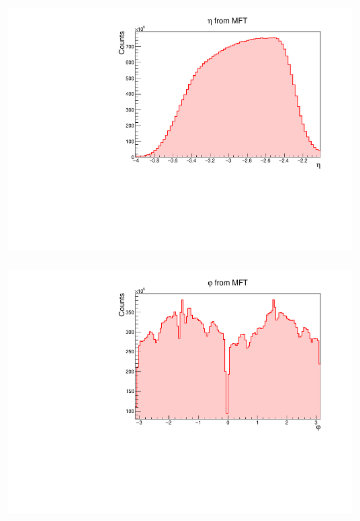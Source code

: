 \begin{figure}[h]%
    \centering
    \begin{subfigure}[t]{.49\linewidth}
        \centering
        \includegraphics[width=\linewidth]{Plots/pass4_MFT/MFTeta_pass4.pdf}
        \caption{}
        \label{}
    \end{subfigure}
    \hfill
    \begin{subfigure}[t]{.49\linewidth}
        \centering
        \includegraphics[width=\linewidth]{Plots/pass4_MFT/phi_pass4.pdf}
        \caption{}
        \label{}
    \end{subfigure}
    \begin{subfigure}[t]{.49\linewidth}
        \centering

\end{subfigure}
\end{figure}
